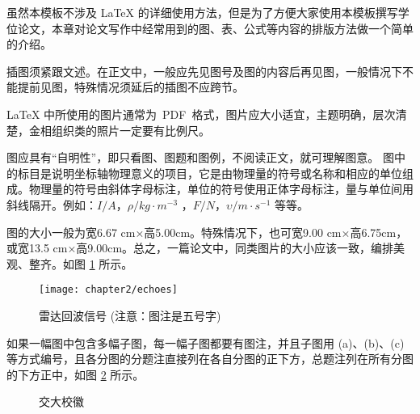 

虽然本模板不涉及 \LaTeX{} 的详细使用方法，但是为了方便大家使用本模板撰写学位论文，本章对论文写作中经常用到的{\hei 图、表、公式}等内容的排版方法做一个简单的介绍。


插图须紧跟文述。在正文中，一般应先见图号及图的内容后再见图，一般情况下不能提前见图，特殊情况须延后的插图不应跨节。

\LaTeX{} 中所使用的图片通常为~PDF~格式，图片应大小适宜，主题明确，层次清楚，金相组织类的照片一定要有比例尺。

图应具有“自明性”，即只看图、图题和图例，不阅读正文，就可理解图意。
图中的标目是说明坐标轴物理意义的项目，它是由物理量的符号或名称和相应的单位组成。物理量的符号由斜体字母标注，单位的符号使用正体字母标注，量与单位间用斜线隔开。例如：$I / A$，$\rho / kg \cdot m^{-3}$ ，$F/N$，$\upsilon / m \cdot s^{-1} $ 等等。

图的大小一般为宽6.67 cm×高5.00cm。特殊情况下，也可宽9.00 cm×高6.75cm，或宽13.5 cm×高9.00cm。总之，一篇论文中，同类图片的大小应该一致，编排美观、整齐。如图 \ref{fig_ch2_echoes} 所示。
\begin{figure}[!ht]
	\centering
	\texttt{[image: chapter2/echoes]}
	\caption{雷达回波信号 ({\color{red}注意}：图注是五号字)} \label{fig_ch2_echoes}
\end{figure}


如果一幅图中包含多幅子图，每一幅子图都要有图注，并且子图用 (a)、(b)、(c) 等方式编号，且各分图的分题注直接列在各自分图的正下方，总题注列在所有分图的下方正中，如图 \ref{fig_ch2_badge} 所示。
\begin{figure}[!ht]
	\centering
	 \hfill
	\caption{交大校徽 \label{fig_ch2_badge}}
\end{figure}


